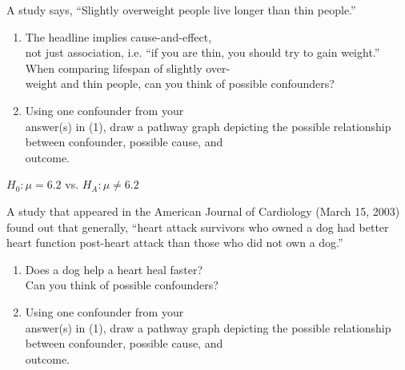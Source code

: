 \documentclass[11pt, chapterprefix=true]{scrbook}\usepackage[]{graphicx}\usepackage[]{color}
\begin{document}
\begin{exercises}
  \begin{exercise} %

A study says, ``Slightly overweight people live longer than thin people.''

\begin{enumerate}
  \item The headline implies cause-and-effect, \\ not just association, i.e. ``if you are thin, you should try to gain weight.''  When comparing lifespan of slightly over- \\ weight and thin people, can you think of possible confounders?
  \item Using one confounder from your \\ answer(s) in (1), draw a pathway graph depicting the possible relationship between confounder, possible cause, and \\ outcome.
\end{enumerate}

	\end{exercise}
	\begin{solution}  %

	  $H_0: \mu = 6.2$ vs. $H_A: \mu \neq 6.2$
	\end{solution}

  \begin{exercise} %

A study that appeared in the American Journal of Cardiology (March 15, 2003) found out that generally, ``heart attack survivors who owned a dog had better heart function post-heart attack than those who did not own a dog.''

\begin{enumerate}
  \item Does a dog help a heart heal faster?  \\ Can you think of possible confounders?
  \item Using one confounder from your \\ answer(s) in (1), draw a pathway graph depicting the possible relationship between confounder, possible cause, and \\ outcome.
\end{enumerate}

	\end{exercise}


\end{exercises}
\end{document}
